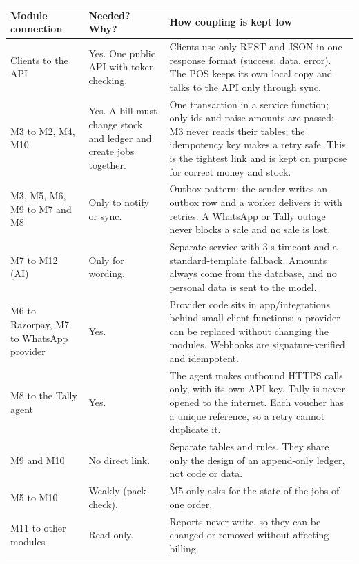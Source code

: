 \documentclass[12pt,a4paper]{article}
\providecommand{\real}[1]{#1}
\begin{document}
\begin{longtable}[]{@{}
  >{\raggedright\arraybackslash}p{(\columnwidth - 4\tabcolsep) * \real{0.1989}}
  >{\raggedright\arraybackslash}p{(\columnwidth - 4\tabcolsep) * \real{0.2431}}
  >{\raggedright\arraybackslash}p{(\columnwidth - 4\tabcolsep) * \real{0.5580}}@{}}
\toprule\noalign{}
\textbf{Module connection} & \textbf{Needed? Why?} & \textbf{How coupling is kept low} \\
\midrule\noalign{}
\endhead
\bottomrule\noalign{}
\endlastfoot
Clients to the API & Yes. One public API with token checking. & Clients
use only REST and JSON in one response format (success, data, error).
The POS keeps its own local copy and talks to the API only through
sync. \\
M3 to M2, M4, M10 & Yes. A bill must change stock and ledger and create
jobs together. & One transaction in a service function; only ids and
paise amounts are passed; M3 never reads their tables; the idempotency
key makes a retry safe. This is the tightest link and is kept on purpose
for correct money and stock. \\
M3, M5, M6, M9 to M7 and M8 & Only to notify or sync. & Outbox pattern:
the sender writes an outbox row and a worker delivers it with retries. A
WhatsApp or Tally outage never blocks a sale and no sale is lost. \\
M7 to M12 (AI) & Only for wording. & Separate service with 3 s timeout
and a standard-template fallback. Amounts always come from the database,
and no personal data is sent to the model. \\
M6 to Razorpay, M7 to WhatsApp provider & Yes. & Provider code sits in
app/integrations behind small client functions; a provider can be
replaced without changing the modules. Webhooks are signature-verified
and idempotent. \\
M8 to the Tally agent & Yes. & The agent makes outbound HTTPS calls
only, with its own API key. Tally is never opened to the internet. Each
voucher has a unique reference, so a retry cannot duplicate it. \\
M9 and M10 & No direct link. & Separate tables and rules. They share
only the design of an append-only ledger, not code or data. \\
M5 to M10 & Weakly (pack check). & M5 only asks for the state of the
jobs of one order. \\
M11 to other modules & Read only. & Reports never write, so they can be
changed or removed without affecting billing. \\
\end{longtable}
\end{document}
